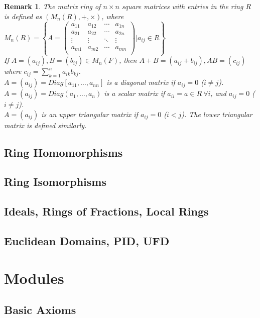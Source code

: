 \documentclass[a4paper,sfsidenotes,openany]{tufte-book}
\theoremstyle{theorem}
\newtheorem{remark}[theorem]{Remark}
\begin{document}
\begin{fullwidth}
\begin{remark}
The {{\color{blue} matrix ring of $n \times n$ square matrices with entries in the ring $R$}} is defined as $(M_n(R), +, \times)$, where\\
$M_n(R) = \left\{A=\begin{pmatrix}
a_{11} & a_{12} & \cdots & a_{1n}\\
a_{21} & a_{22} & \cdots & a_{2n}\\
\vdots & \vdots & \ddots & \vdots\\
a_{m1} & a_{m2} & \cdots & a_{mn}\\
\end{pmatrix} | a_{ij} \in R \right\}$\\
If $A = (a_{ij}), B = (b_{ij}) \in M_n(F)$, then $A+B=(a_{ij} + b_{ij}), AB = (c_{ij})$ where $c_{ij} = \sum_{k=1}^{n} a_{ik} b_{kj}$.\\
$A=(a_{ij}) = Diag[a_{11}, \ldots, a_{nn}]$ is a diagonal matrix if $a_{ij} = 0$ ($i \neq j$).\\
$A=(a_{ij}) = Diag(a_1, \ldots, a_n)$ is a scalar matrix if $a_{ii} = a \in R \ \forall i$, and $a_{ij} = 0$ ($i \neq j$).\\
$A=(a_{ij})$ is an upper triangular matrix if $a_{ij}=0$ ($i < j$). The lower triangular matrix is defined similarly.\\
\end{remark}
\>

\section{Ring Homomorphisms}

\section{Ring Isomorphisms}

\section{Ideals, Rings of Fractions, Local Rings}

\section{Euclidean Domains, PID, UFD}

\end{fullwidth}

\newpage

\chapter{Modules}
\begin{fullwidth}
\section{Basic Axioms}

\end{fullwidth}
\end{document}
